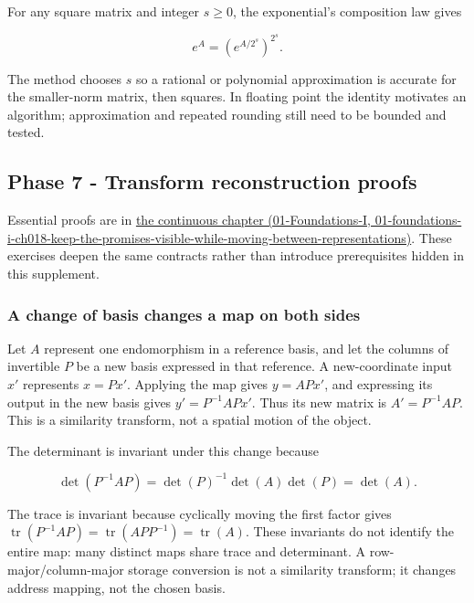For any square matrix and integer \(s\ge0\), the exponential's composition law gives

\[
e^A=\left(e^{A/2^s}\right)^{2^s}.
\]

The method chooses \(s\) so a rational or polynomial approximation is accurate for the smaller-norm matrix, then squares. In floating point the identity motivates an algorithm; approximation and repeated rounding still need to be bounded and tested.

\subsection{Phase 7 - Transform reconstruction proofs}\label{02-foundations-ii-ch039-phase-7---transform-reconstruction-proofs}

Essential proofs are in \href{../01-Foundations-I/main.pdf\#nameddest=01-foundations-i-ch018-keep-the-promises-visible-while-moving-between-representations}{the continuous chapter (01-Foundations-I, 01-foundations-i-ch018-keep-the-promises-visible-while-moving-between-representations)}. These exercises deepen the same contracts rather than introduce prerequisites hidden in this supplement.

\subsubsection{A change of basis changes a map on both sides}\label{02-foundations-ii-ch039-a-change-of-basis-changes-a-map-on-both-sides}

Let \(A\) represent one endomorphism in a reference basis, and let the columns of invertible \(P\) be a new basis expressed in that reference. A new-coordinate input \(x'\) represents \(x=Px'\). Applying the map gives \(y=APx'\), and expressing its output in the new basis gives \(y'=P^{-1}APx'\). Thus its new matrix is \(A'=P^{-1}AP\). This is a similarity transform, not a spatial motion of the object.

The determinant is invariant under this change because

\[
\det(P^{-1}AP)=\det(P)^{-1}\det(A)\det(P)=\det(A).
\]

The trace is invariant because cyclically moving the first factor gives \(\operatorname{tr}(P^{-1}AP)=\operatorname{tr}(APP^{-1})=\operatorname{tr}(A)\). These invariants do not identify the entire map: many distinct maps share trace and determinant. A row-major/column-major storage conversion is not a similarity transform; it changes address mapping, not the chosen basis.

